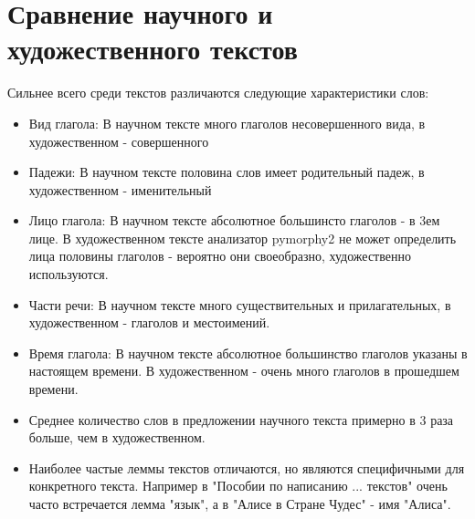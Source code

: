 \documentclass[a4paper,12pt]{article}
\begin{document}
\section{Сравнение научного и художественного текстов}
Сильнее всего среди текстов различаются следующие характеристики слов:
\begin{itemize}
\item Вид глагола: В научном тексте много глаголов несовершенного вида, в художественном - совершенного
\item Падежи: В научном тексте половина слов имеет родительный падеж, в художественном - именительный
\item Лицо глагола: В научном тексте абсолютное большинсто глаголов - в 3ем лице. В художественном тексте анализатор pymorphy2 не может определить лица половины глаголов - вероятно они своеобразно, художественно используются.
\item Части речи: В научном тексте много существительных и прилагательных, в художественном - глаголов и местоимений.
\item Время глагола: В научном тексте абсолютное большинство глаголов указаны в настоящем времени. В художественном - очень много глаголов в прошедшем времени.
\item Среднее количество слов в предложении научного текста примерно в 3 раза больше, чем в художественном.
\item Наиболее частые леммы текстов отличаются, но являются специфичными для конкретного текста. Например в "Пособии по написанию ... текстов" очень часто встречается лемма "язык", а в "Алисе в Стране Чудес" - имя "Алиса".
\end{itemize}
\end{document}
